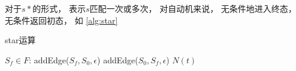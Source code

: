 \documentclass[../report.tex]{subfiles}
\begin{document}
  对于$s*$的形式，
  表示$s$匹配一次或多次，
  对自动机来说，
  无条件地进入终态，
  无条件返回初态，
  如%
  \cref{alg:star}
  
  \begin{algorithm}[H]
    \caption{star运算}
    \begin{codebox}
        \li \For $S_f \in F$:
        \Then
          \li addEdge($S_f,S_0,\epsilon$)
          \li addEdge($S_0,S_f,\epsilon$)
        \End
        \li \Return $N(t)$
    \end{codebox}
    \label{alg:star}
  \end{algorithm}
\end{document}
